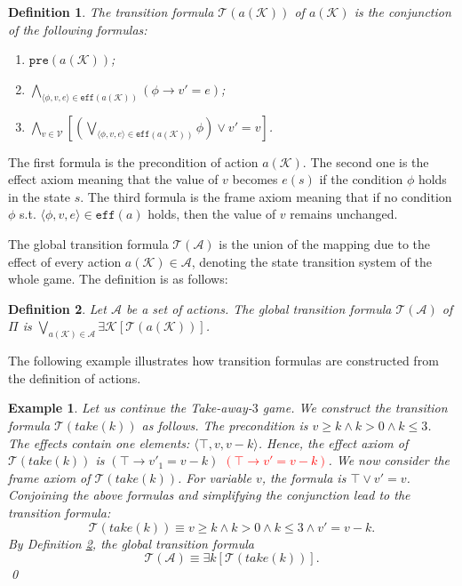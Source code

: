 \documentclass[review]{elsarticle}
\newcommand{\tuple}[1]{\langle {#1} \rangle}
\newcommand{\true}{\top}
\newcommand{\actparm}{\mathcal{K}}
\newcommand{\act}{\mathcal{A}}
\newcommand{\trans}{\mathcal{T}}
\newcommand{\pre}{\mathtt{pre}}
\newcommand{\eff}{\mathtt{eff}}
\newcommand{\con}{\phi}
\newcommand{\var}{\mathcal{V}}
\newtheorem{definition}{Definition}
\newtheorem{example}{Example}
\begin{document}
    \begin{definition}\label{def:transForm} \rm	
    	The transition formula $\trans(a(\actparm))$ of $a(\actparm)$ is the conjunction of the following formulas: 
    	\begin{enumerate}
    		\item $\pre(a(\actparm))$;
    		\item $\bigwedge_{\tuple{\con, v, e} \in \eff(a(\actparm))} (\con \rightarrow v' = e)$;
    		\item $\bigwedge_{v \in \var} [(\bigvee_{\tuple{\con, v, e} \in \eff(a(\actparm))} \con) \lor v' = v]$.
    	\end{enumerate}
    \end{definition}
    
    The first formula is the precondition of action $a(\actparm)$.
    The second one is the effect axiom meaning that the value of $v$ becomes $e(s)$ if the condition $\con$ holds in the state $s$.
    The third formula is the frame axiom meaning that if no condition $\con$ s.t. $\tuple{\con, v, e} \in \eff(a)$ holds, then the value of $v$ remains unchanged. 
    
    The global transition formula $\trans(\act)$ is the union of the mapping due to the effect of every action $a(\actparm) \in \act$, denoting the state transition system of the whole game.
    The definition is as follows:
    
    \begin{definition}\label{def:globalTransForm} \rm
    	Let $\act$ be a set of actions.
    	The global transition formula $\trans(\act)$ of $\Pi$ is $\bigvee_{a(\actparm) \in \act} \exists \actparm [\trans(a(\actparm))]$.
    \end{definition}
    
    The following example illustrates how transition formulas are constructed from the definition of actions.
    \begin{example}\label{exm:transForm} \rm
    	Let us continue the Take-away-$3$ game.
    	We construct the transition formula $\trans(take(k))$ as follows.
    	The precondition is $v \geq k \land k > 0 \land k \leq 3$.
    	The effects contain one elements: $\tuple{\true, v, v - k}$.
    	Hence, the effect axiom of $\trans(take(k))$ is $(\true \rightarrow v'_1 = v - k)$ \textcolor{red}{$(\true \rightarrow v' = v - k)$}.
    	We now consider the frame axiom of $\trans(take(k))$.
    	For variable $v$, the formula is $\true \lor v' = v $.
    	Conjoining the above formulas and simplifying the conjunction lead to the transition formula: 
    	\[\trans(take(k)) \equiv v \geq k \land k > 0 \land k \leq 3 \land v' = v - k.\]
    	By Definition \ref{def:globalTransForm}, the global transition formula
    	\[\trans(\act) \equiv \exists k [\trans(take(k))].\]  	\qed
    \end{example}
    
\end{document}
